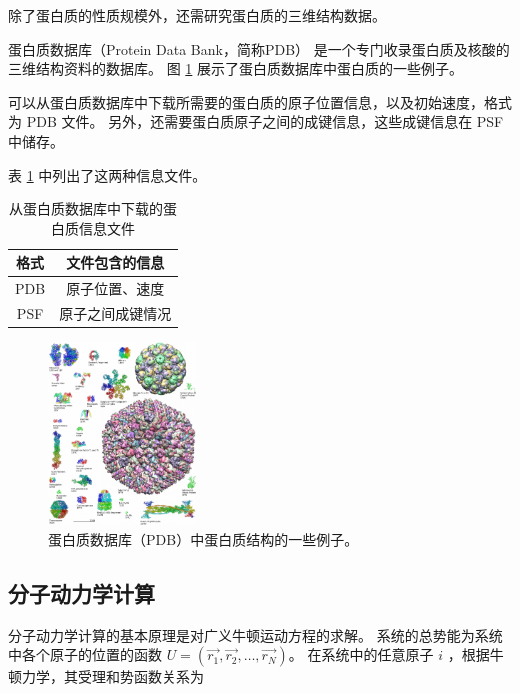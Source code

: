 除了蛋白质的性质规模外，还需研究蛋白质的三维结构数据。

蛋白质数据库（Protein Data Bank，简称PDB）\cite{burley2017protein,sussman1998protein} 是一个专门收录蛋白质及核酸的三维结构资料的数据库。
图 \ref{fig:protein-db} 展示了蛋白质数据库中蛋白质的一些例子。

可以从蛋白质数据库中下载所需要的蛋白质的原子位置信息，以及初始速度，格式为 PDB 文件。
另外，还需要蛋白质原子之间的成键信息，这些成键信息在 PSF 中储存。

表 \ref{tab:protein-files} 中列出了这两种信息文件。

\begin{table}[h]
    \centering
    \caption{从蛋白质数据库中下载的蛋白质信息文件}
    \label{tab:protein-files}
    \begin{tabular}{cc}
        \toprule
        格式  & 文件包含的信息  \\
        \midrule
        PDB & 原子位置、速度  \\
        PSF & 原子之间成键情况 \\
        \bottomrule
    \end{tabular}
\end{table}

\begin{figure}[h]
    \centering
    \includegraphics[width=0.35\textwidth]{images/1024px-Protein_structure_examples.png}
    \caption{蛋白质数据库（PDB）中蛋白质结构的一些例子。}
    \label{fig:protein-db}
\end{figure}

\subsection{分子动力学计算}

分子动力学计算的基本原理是对广义牛顿运动方程的求解。
系统的总势能为系统中各个原子的位置的函数 $U = (\vec{r_1}, \vec{r_2}, \dots, \vec{r_N})$。
在系统中的任意原子 $i$ ，根据牛顿力学，其受理和势函数关系为


